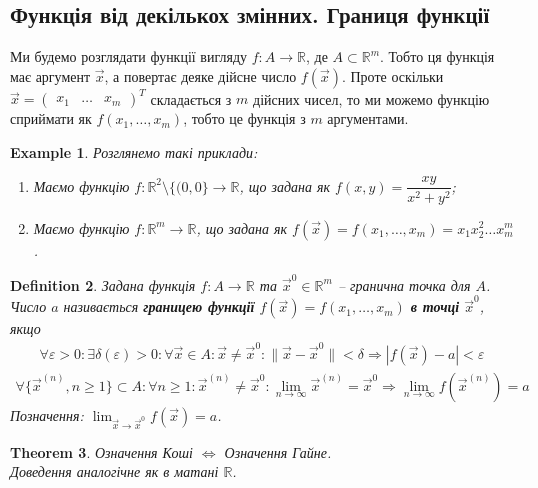 \documentclass[a4paper, 10pt]{article}
\def\huge{\displaystyle}
\theoremstyle{theoremdd}
\newtheorem{theorem}{Theorem}[subsection]
\theoremstyle{theoremdd}
\theoremstyle{theoremdd}
\newtheorem{definition}[theorem]{Definition}
\theoremstyle{theoremdd}
\theoremstyle{theoremdd}
\newtheorem{example}[theorem]{Example}
\theoremstyle{theoremdd}
\theoremstyle{theoremdd}
\theoremstyle{theoremdd}
\theoremstyle{theoremdd}
\begin{document}
\subsection{Функція від декількох змінних. Границя функції}
Ми будемо розглядати функції вигляду $f \colon A \to \mathbb{R}$, де $A \subset \mathbb{R}^m$. Тобто ця функція має аргумент $\vec{x}$, а повертає деяке дійсне число $f(\vec{x})$. Проте оскільки $\vec{x} = \begin{pmatrix}
x_1 & \dots & x_m
\end{pmatrix}^T$ складається з $m$ дійсних чисел, то ми можемо функцію сприймати як $f(x_1,\dots,x_m)$, тобто це функція з $m$ аргументами.

\begin{example} Розглянемо такі приклади:
\begin{enumerate}[nosep,wide=0pt,label={\arabic*)}]
\item Маємо функцію $f \colon \mathbb{R}^2 \setminus \{(0,0\} \to \mathbb{R}$, що задана як $f(x,y) = \dfrac{xy}{x^2+y^2}$;
\item Маємо функцію $f \colon \mathbb{R}^m \to \mathbb{R}$, що задана як $f(\vec{x}) = f(x_1,\dots,x_m) = x_1 x_2^2 \dots x_m^m$.
\end{enumerate}
\end{example}

\begin{definition}
Задана функція $f \colon A \to \mathbb{R}$ та $\vec{x}^0 \in \mathbb{R}^m$ -- гранична точка для $A$.\\
Число $a$ називається \textbf{границею функції} $f(\vec{x}) = f(x_1,\dots,x_m)$ \textbf{в точці} $\vec{x}^0$, якщо
	\begin{align*}
	\forall \varepsilon > 0: \exists \delta(\varepsilon) > 0: \forall \vec{x} \in A: \vec{x} \neq \vec{x}^0: \|\vec{x}-\vec{x}^0\|<\delta \Rightarrow |f(\vec{x})-a|<\varepsilon \tag*{означення Коші}
	\end{align*}
	\begin{align*}
	\forall \{\vec{x}^{(n)}, n \geq 1\} \subset A: \forall n \geq 1: \vec{x}^{(n)} \neq \vec{x}^0: \lim_{n \to \infty} \vec{x}^{(n)} = \vec{x}^0 \Rightarrow \lim_{n \to \infty} f(\vec{x}^{(n)}) = a \tag*{означення Гайне}
	\end{align*}
Позначення: $\huge \lim_{\vec{x} \to \vec{x}^0} f(\vec{x}) = a$.
\end{definition}

\begin{theorem}
Означення Коші $\iff$ Означення Гайне.\\
\textit{Доведення аналогічне як в матані $\mathbb{R}$.}
\end{theorem}
\end{document}
